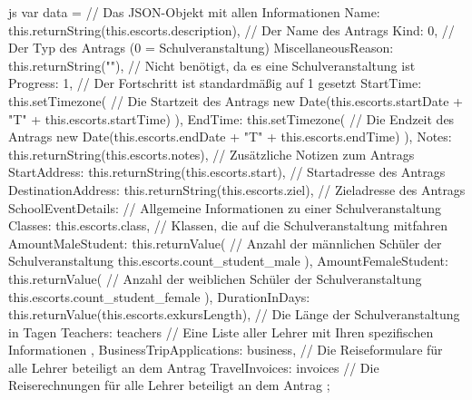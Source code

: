 \begin{code}{js}
var data = {		// Das JSON-Objekt mit allen Informationen
	Name: this.returnString(this.escorts.description),	// Der Name des Antrags
	Kind: 0,	// Der Typ des Antrags (0 = Schulveranstaltung)
	MiscellaneousReason: this.returnString(""),			// Nicht benötigt, da es eine Schulveranstaltung ist
	Progress: 1,	// Der Fortschritt ist standardmäßig auf 1 gesetzt
	StartTime: this.setTimezone(	// Die Startzeit des Antrags
	new Date(this.escorts.startDate + "T" + this.escorts.startTime)
	),
	EndTime: this.setTimezone(	// Die Endzeit des Antrags
	new Date(this.escorts.endDate + "T" + this.escorts.endTime)
	),
	Notes: this.returnString(this.escorts.notes),	// Zusätzliche Notizen zum Antrags
	StartAddress: this.returnString(this.escorts.start),	// Startadresse des Antrags
	DestinationAddress: this.returnString(this.escorts.ziel), // Zieladresse des Antrags
	SchoolEventDetails: {	// Allgemeine Informationen zu einer Schulveranstaltung
		Classes: this.escorts.class,	// Klassen, die auf die Schulveranstaltung mitfahren
		AmountMaleStudent: this.returnValue(	// Anzahl der männlichen Schüler der Schulveranstaltung
		this.escorts.count_student_male
		),
		AmountFemaleStudent: this.returnValue(	// Anzahl der weiblichen Schüler der Schulveranstaltung
		this.escorts.count_student_female
		),
		DurationInDays: this.returnValue(this.escorts.exkursLength),	// Die Länge der Schulveranstaltung in Tagen
		Teachers: teachers	// Eine Liste aller Lehrer mit Ihren spezifischen Informationen
	},
	BusinessTripApplications: business,	// Die Reiseformulare für alle Lehrer beteiligt an dem Antrag
	TravelInvoices: invoices	// Die Reiserechnungen für alle Lehrer beteiligt an dem Antrag
};
\end{code}
~\\
\newpage
